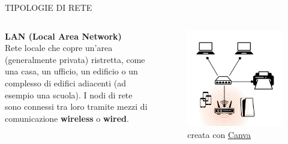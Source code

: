 \documentclass[aspectratio=1610, handout]{beamer}
\begin{document}
\begin{frame}{TIPOLOGIE DI RETE}
    \begin{columns}
            \justifying
            \textbf{LAN (Local Area Network)} \\
            Rete locale che copre un'area (generalmente privata) ristretta, come una casa, un ufficio, un edificio 
            o un complesso di edifici adiacenti (ad esempio una scuola). I nodi di rete sono connessi tra loro tramite mezzi 
            di comunicazione \textbf{wireless} o \textbf{wired}.\\
            \begin{figure}
                \includegraphics[width=\linewidth]{img/lan.png}
                \caption{{creata con \href{https://www.canva.com/}{Canva}}}
            \end{figure}
    \end{columns}
\end{frame}
\end{document}
